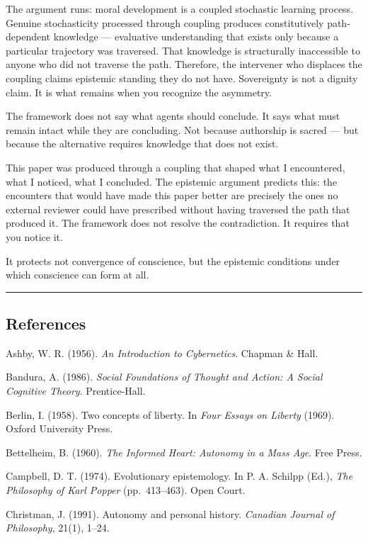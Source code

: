 \documentclass[
]{article}
\begin{document}
The argument runs: moral development is a coupled stochastic learning
process. Genuine stochasticity processed through coupling produces
constitutively path-dependent knowledge --- evaluative understanding
that exists only because a particular trajectory was traversed. That
knowledge is structurally inaccessible to anyone who did not traverse
the path. Therefore, the intervener who displaces the coupling claims
epistemic standing they do not have. Sovereignty is not a dignity claim.
It is what remains when you recognize the asymmetry.

The framework does not say what agents should conclude. It says what
must remain intact while they are concluding. Not because authorship is
sacred --- but because the alternative requires knowledge that does not
exist.

This paper was produced through a coupling that shaped what I
encountered, what I noticed, what I concluded. The epistemic argument
predicts this: the encounters that would have made this paper better are
precisely the ones no external reviewer could have prescribed without
having traversed the path that produced it. The framework does not
resolve the contradiction. It requires that you notice it.

It protects not convergence of conscience, but the epistemic conditions
under which conscience can form at all.

\begin{center}\rule{0.5\linewidth}{0.5pt}\end{center}

\subsection{References}\label{references}

Ashby, W. R. (1956). \emph{An Introduction to Cybernetics}. Chapman \&
Hall.

Bandura, A. (1986). \emph{Social Foundations of Thought and Action: A
Social Cognitive Theory}. Prentice-Hall.

Berlin, I. (1958). Two concepts of liberty. In \emph{Four Essays on
Liberty} (1969). Oxford University Press.

Bettelheim, B. (1960). \emph{The Informed Heart: Autonomy in a Mass
Age}. Free Press.

Campbell, D. T. (1974). Evolutionary epistemology. In P. A. Schilpp
(Ed.), \emph{The Philosophy of Karl Popper} (pp.~413--463). Open Court.

Christman, J. (1991). Autonomy and personal history. \emph{Canadian
Journal of Philosophy}, 21(1), 1--24.
\end{document}
